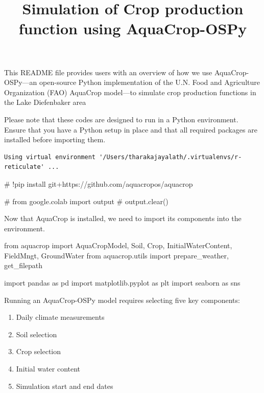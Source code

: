 \documentclass[
  letterpaper,
  DIV=11,
  numbers=noendperiod]{scrartcl}
\title{Simulation of Crop production function using AquaCrop-OSPy}
\author{}
\date{}
\newenvironment{Shaded}{\begin{snugshade}}{\end{snugshade}}
\newcommand{\CommentTok}[1]{\textcolor[rgb]{0.37,0.37,0.37}{#1}}
\newcommand{\ImportTok}[1]{\textcolor[rgb]{0.00,0.46,0.62}{#1}}
\newcommand{\NormalTok}[1]{\textcolor[rgb]{0.00,0.23,0.31}{#1}}
\providecommand{\tightlist}{%
  \setlength{\itemsep}{0pt}\setlength{\parskip}{0pt}}\usepackage{longtable,booktabs,array}
\begin{document}
\maketitle


This README file provides users with an overview of how we use
AquaCrop-OSPy---an open-source Python implementation of the U.N. Food
and Agriculture Organization (FAO) AquaCrop model---to simulate crop
production functions in the Lake Diefenbaker area

Please note that these codes are designed to run in a Python
environment. Ensure that you have a Python setup in place and that all
required packages are installed before importing them.

\begin{verbatim}
Using virtual environment '/Users/tharakajayalath/.virtualenvs/r-reticulate' ...
\end{verbatim}

\begin{Shaded}
\begin{Highlighting}[]
\CommentTok{\# !pip install git+https://github.com/aquacropos/aquacrop}

\CommentTok{\# from google.colab import output}
\CommentTok{\# output.clear()}
\end{Highlighting}
\end{Shaded}

Now that AquaCrop is installed, we need to import its components into
the environment.

\begin{Shaded}
\begin{Highlighting}[]
\ImportTok{from}\NormalTok{ aquacrop }\ImportTok{import}\NormalTok{ AquaCropModel, Soil, Crop, InitialWaterContent, FieldMngt, GroundWater}
\ImportTok{from}\NormalTok{ aquacrop.utils }\ImportTok{import}\NormalTok{ prepare\_weather, get\_filepath}

\ImportTok{import}\NormalTok{ pandas }\ImportTok{as}\NormalTok{ pd}
\ImportTok{import}\NormalTok{ matplotlib.pyplot }\ImportTok{as}\NormalTok{ plt}
\ImportTok{import}\NormalTok{ seaborn }\ImportTok{as}\NormalTok{ sns}
\end{Highlighting}
\end{Shaded}

Running an AquaCrop-OSPy model requires selecting five key components:

\begin{enumerate}
\def\labelenumi{\arabic{enumi}.}
\tightlist
\item
  Daily climate measurements
\item
  Soil selection
\item
  Crop selection
\item
  Initial water content
\item
  Simulation start and end dates
\end{enumerate}
\end{document}
